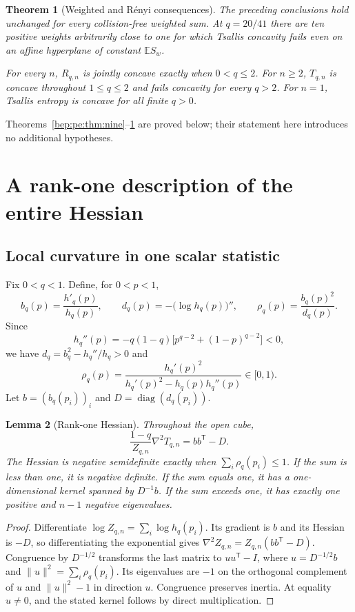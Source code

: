 \documentclass[11pt]{article}
\numberwithin{equation}{section}
\newtheorem{theorem}{Theorem}[section]
\newtheorem{lemma}[theorem]{Lemma}
\theoremstyle{definition}
\theoremstyle{remark}
\newcommand{\diag}{\operatorname{diag}}
\newcommand{\Tq}{T_{q,n}}
\newcommand{\Zq}{Z_{q,n}}
\begin{document}
\begin{theorem}[Weighted and R\'enyi consequences]\label{bep:pe:thm:other-summary}
The preceding conclusions hold unchanged for every collision-free
weighted sum. At $q=20/41$ there are ten positive weights arbitrarily
close to one for which Tsallis concavity fails even on an affine
hyperplane of constant $\mathbb E S_w$.

For every $n$, $R_{q,n}$ is jointly concave exactly when $0<q\leq2$.
For $n\geq2$, $T_{q,n}$ is concave throughout $1\leq q\leq2$ and fails
concavity for every $q>2$. For $n=1$, Tsallis entropy is concave for all
finite $q>0$.
\end{theorem}
Theorems~\ref{bep:pe:thm:nine}--\ref{bep:pe:thm:other-summary} are proved below; their
statement here introduces no additional hypotheses.

\section{A rank-one description of the entire Hessian}\label{bep:pe:sec:rankone}
\subsection{Local curvature in one scalar statistic}
Fix $0<q<1$. Define, for $0<p<1$,
\begin{equation}
 b_q(p)=\frac{h'_q(p)}{h_q(p)},\qquad
 d_q(p)=-\bigl(\log h_q(p)\bigr)'',\qquad
 \rho_q(p)=\frac{b_q(p)^2}{d_q(p)}.\label{bep:pe:eq:bdrho}
\end{equation}
Since
\begin{equation}
 h_q''(p)=-q(1-q)\bigl[p^{q-2}+(1-p)^{q-2}\bigr]<0,
\end{equation}
we have $d_q=b_q^2-h_q''/h_q>0$ and
\begin{equation}
 \rho_q(p)=\frac{h_q'(p)^2}{h_q'(p)^2-h_q(p)h_q''(p)}\in[0,1).
\end{equation}
Let $b=(b_q(p_i))_i$ and $D=\diag(d_q(p_i))$.

\begin{lemma}[Rank-one Hessian]\label{bep:pe:lem:hessian}
Throughout the open cube,
\begin{equation}
 \frac{1-q}{\Zq}\nabla^2\Tq=bb^{\mathsf T}-D.\label{bep:pe:eq:hessian}
\end{equation}
The Hessian is negative semidefinite exactly when
$\sum_i\rho_q(p_i)\leq1$. If the sum is less than one, it is negative
definite. If the sum equals one, it has a one-dimensional kernel spanned
by $D^{-1}b$. If the sum exceeds one, it has exactly one positive
and $n-1$ negative eigenvalues.
\end{lemma}
\begin{proof}
Differentiate $\log\Zq=\sum_i\log h_q(p_i)$. Its gradient is $b$ and its
Hessian is $-D$, so differentiating the exponential gives
$\nabla^2\Zq=\Zq(bb^{\mathsf T}-D)$. Congruence by $D^{-1/2}$ transforms
the last matrix to $uu^{\mathsf T}-I$, where $u=D^{-1/2}b$ and
$\|u\|^2=\sum_i\rho_q(p_i)$. Its eigenvalues are $-1$ on the
orthogonal complement of $u$ and $\|u\|^2-1$ in direction $u$.
Congruence preserves inertia. At equality $u\ne0$, and the stated
kernel follows by direct multiplication.
\end{proof}
\end{document}
